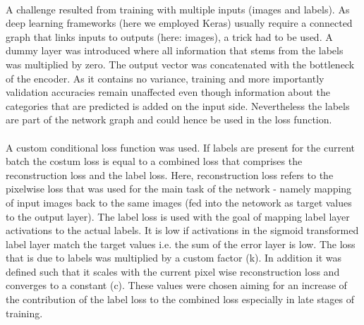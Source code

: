 \\
A challenge resulted from training with multiple inputs (images and labels). As deep learning frameworks (here we employed Keras) usually require a connected graph that links inputs to outputs (here: images), a trick had to be used. A dummy layer was introduced where all information that stems from the labels was multiplied by zero. The output vector was concatenated with the bottleneck of the encoder. As it contains no variance, training and more importantly validation accuracies remain unaffected even though information about the categories that are predicted is added on the input side. Nevertheless the labels are part of the network graph and could hence be used in the loss function.  \\
\\
A custom conditional loss function was used. If labels are present for the current batch the costum loss is equal to a combined loss that comprises the reconstruction loss and the label loss. Here, reconstruction loss refers to the pixelwise loss that was used for the main task of the network - namely mapping of input images back to the same images (fed into the netowork as target values to the output layer). The label loss is used with the goal of mapping label layer activations to the actual labels. It is low if activations in the sigmoid transformed label layer match the target values i.e. the sum of the error layer is low. The loss that is due to labels was multiplied by a custom factor (k). In addition it was defined such that it scales with the current pixel wise reconstruction loss and converges to a constant (c). These values were chosen aiming for an increase of the contribution of the label loss to the combined loss especially in late stages of training.\\

